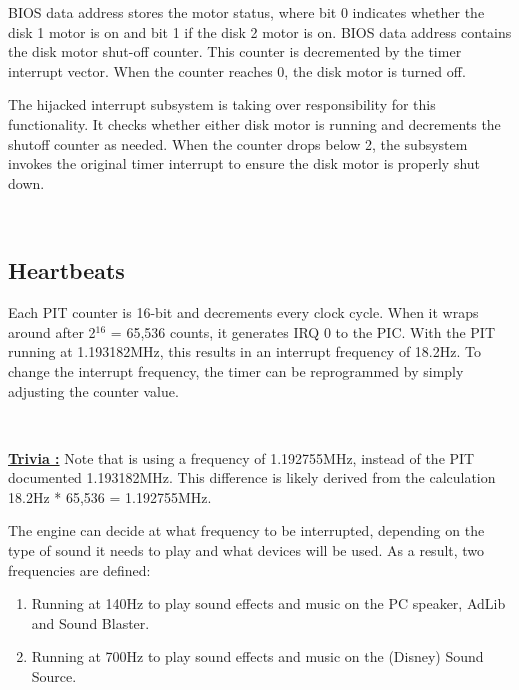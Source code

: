 \documentclass[book.tex]{subfiles}
\begin{document}
\pagebreak
BIOS data address  stores the motor status, where bit 0 indicates whether the disk 1 motor is on and bit 1 if the disk 2 motor is on. BIOS data address  contains the disk motor shut-off counter. This counter is decremented by the timer interrupt vector. When the counter reaches 0, the disk motor is turned off.\\

\par
The hijacked interrupt subsystem is taking over responsibility for this functionality. It checks whether either disk motor is running and decrements the shutoff counter as needed. When the counter drops below 2, the subsystem invokes the original timer interrupt to ensure the disk motor is properly shut down.\\

\par
\begin{minipage}{\textwidth}

\end{minipage}\\
\par

\subsection{Heartbeats}
Each PIT counter is 16-bit and decrements every clock cycle. When it wraps around after 2$^{16}$ = 65,536 counts, it generates IRQ 0 to the PIC. With the PIT running at 1.193182MHz, this results in an interrupt frequency of 18.2Hz. To change the interrupt frequency, the timer can be reprogrammed by simply adjusting the counter value.

\par
\begin{minipage}{\textwidth}

\end{minipage}\\
\par

\textbf{\underline{Trivia :}} Note that  is using a frequency of 1.192755MHz, instead of the PIT documented 1.193182MHz. This difference is likely derived from the calculation 18.2Hz * 65,536 = 1.192755MHz.\\

\par
The engine can decide at what frequency to be interrupted, depending on the type of sound it needs to play and what devices will be used. As a result, two frequencies are defined:
\begin{enumerate}
\item Running at 140Hz to play sound effects and music on the PC speaker, AdLib and Sound Blaster.
\item Running at 700Hz to play sound effects and music on the (Disney) Sound Source.
\end{enumerate}
\end{document}
